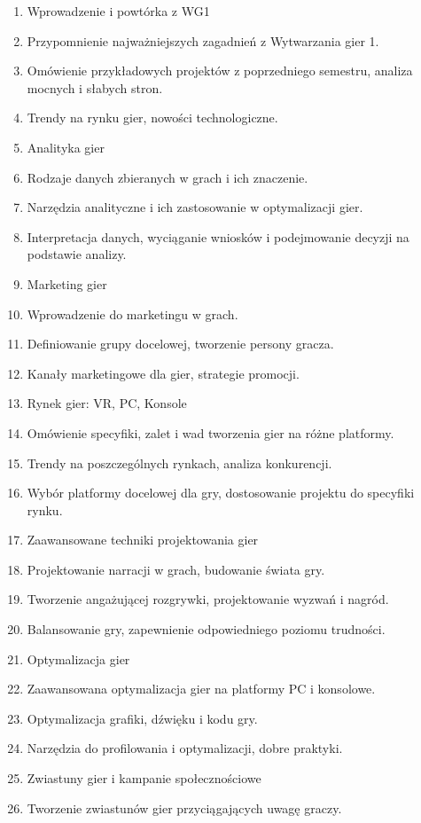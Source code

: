 \documentclass[12pt, a4paper]{article}
\begin{document}
\begin{enumerate}
  \item Wprowadzenie i powtórka z WG1
  \item Przypomnienie najważniejszych zagadnień z Wytwarzania gier 1.
  \item Omówienie przykładowych projektów z poprzedniego semestru, analiza mocnych i słabych stron.
  \item Trendy na rynku gier, nowości technologiczne.
  \item Analityka gier
  \item Rodzaje danych zbieranych w grach i ich znaczenie.
  \item Narzędzia analityczne i ich zastosowanie w optymalizacji gier.
  \item Interpretacja danych, wyciąganie wniosków i podejmowanie decyzji na podstawie analizy.
  \item Marketing gier
  \item Wprowadzenie do marketingu w grach.
  \item Definiowanie grupy docelowej, tworzenie persony gracza.
  \item Kanały marketingowe dla gier, strategie promocji.
  \item Rynek gier: VR, PC, Konsole
  \item Omówienie specyfiki, zalet i wad tworzenia gier na różne platformy.
  \item Trendy na poszczególnych rynkach, analiza konkurencji.
  \item Wybór platformy docelowej dla gry, dostosowanie projektu do specyfiki rynku.
  \item Zaawansowane techniki projektowania gier
  \item Projektowanie narracji w grach, budowanie świata gry.
  \item Tworzenie angażującej rozgrywki, projektowanie wyzwań i nagród.
  \item Balansowanie gry, zapewnienie odpowiedniego poziomu trudności.
  \item Optymalizacja gier
  \item Zaawansowana optymalizacja gier na platformy PC i konsolowe.
  \item Optymalizacja grafiki, dźwięku i kodu gry.
  \item Narzędzia do profilowania i optymalizacji, dobre praktyki.
  \item Zwiastuny gier i kampanie społecznościowe
  \item Tworzenie zwiastunów gier przyciągających uwagę graczy.

\end{enumerate}
\end{document}
